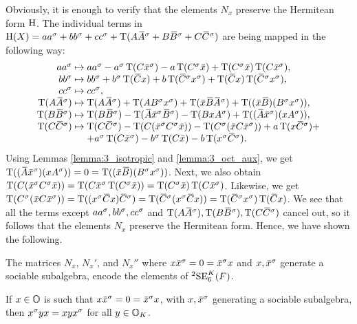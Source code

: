 Obviously, it is enough to verify that the elements $N_x$ preserve the Hermitean form $\mathrm{H}$. 
The individual terms in $\H(X) = aa^{\s} + bb^{\s} + cc^{\s} + \Tr(A\ovA ^{\s} + B\ovB ^{\s} +
C\ovC ^{\s})$ are being mapped in the following way:
\begin{equation}
	\begin{array}{r@{\;}c@{\;}l}
		aa^{\s} & \mapsto & aa^{\s} - a^{\s}\Tr(C\ovx ^{\s}) - a\Tr(C^{\s} \ovx ) 
					+ \Tr(C^{\s}\ovx ) \Tr(C\ovx ^{\s}), \\
		bb^{\s} & \mapsto & bb^{\s} + b^{\s}\Tr(\ovC x) + b\Tr(\ovC ^{\s}x^{\s}) +
					\Tr(\ovC x)\Tr(\ovC ^{\s}x^{\s}), \\
		cc^{\s} & \mapsto & cc^{\s}, \\
		\Tr(A\ovA ^{\s}) & \mapsto & \Tr(A\ovA ^{\s}) + \Tr(AB^{\s}x^{\s}) + 
					\Tr(\ovx \ovB \ovA ^{\s}) + 
					\Tr((\ovx \ovB )(B^{\s}x^{\s})), \\
		\Tr(B\ovB ^{\s}) & \mapsto & \Tr(B\ovB ^{\s}) - 
					\Tr(\ovA \ovx ^{\s} \ovB ^{\s}) - \Tr(BxA^{\s}) + 
					\Tr((\ovA \ovx ^{\s})(xA^{\s})), \\
		\Tr(C\ovC ^{\s}) & \mapsto & \Tr(C\ovC ^{\s}) - 
					\Tr(C(\ovx ^{\s}C^{\s}\ovx )) - \Tr(C^{\s}(\ovx C\ovx ^{\s}))
					+ a\Tr(x\ovC ^{\s}) + \\
					& & + a^{\s}\Tr(C\ovx ^{\s}) -
					b^{\s}\Tr(C\ovx ) - b\Tr(x^{\s}\ovC ^{\s}).
	\end{array}
\end{equation}
Using Lemmas \ref{lemma:3_isotropic} and
\ref{lemma:3_oct_aux}, we get
\mbox{$\Tr((\ovA \ovx ^{\s})(xA^{\s})) = 0= \Tr((\ovx \ovB )(B^{\s}x^{\s}))$}.
Next, we also obtain $\Tr(C( \ovx ^{\s} C^{\s} \ovx )) = \Tr(C \ovx ^{\s}
\Tr(C^{\sigma} \ovx )) = \Tr(C^{\sigma} \ovx )\Tr(C\ovx ^{\s})$. Likewise,
we get $\Tr(C^{\s}(\ovx C\ovx ^{\s})) = \Tr ((x^{\s}\ovC x)\ovC ^{\s}) = 
\Tr(\ovC ^{\s} (x^{\s}\ovC x)) = \Tr(\ovC ^{\s} x^{\s})\Tr(\ovC x)$. We see
that all the terms except $aa^{\sigma},bb^{\sigma},cc^{\sigma}$ and $\Tr(A\ovA ^{\s}),
\Tr(B\ovB ^{\s}), \Tr(C\ovC ^{\s})$ cancel out, so it follows that the elements
$N_x$ preserve the Hermitean form. Hence, we have shown the following. 

\begin{proposition}
	The matrices $N_x$, $N_x'$, and $N_x''$ where $x\ovx^{\s} = 0 = \ovx^{\s}x$ and $x, \mathord{\mbox{\hspace*{0pt}}\,\overline{\!x\!\!\;}\!\:}\mbox{\hspace*{0pt}}^{\sigma}$
	generate a sociable subalgebra, encode the elements of ${}^2\mathrm{SE}_6^K(F)$. 
\end{proposition}

\begin{lemma}
	\label{lemma:sociable}
	If $x \in \mathbb{O}$ is such that $x \ovx^{\s} = 0 = \ovx^{\s} x$, with $x,\mathord{\mbox{\hspace*{0pt}}\,\overline{\!x\!\!\;}\!\:}\mbox{\hspace*{0pt}}^{\sigma}$ generating
	a sociable subalgebra, then $x^{\sigma} y x = x y x^{\sigma}$ for all $y \in \mathbb{O}_K$.  
\end{lemma}

